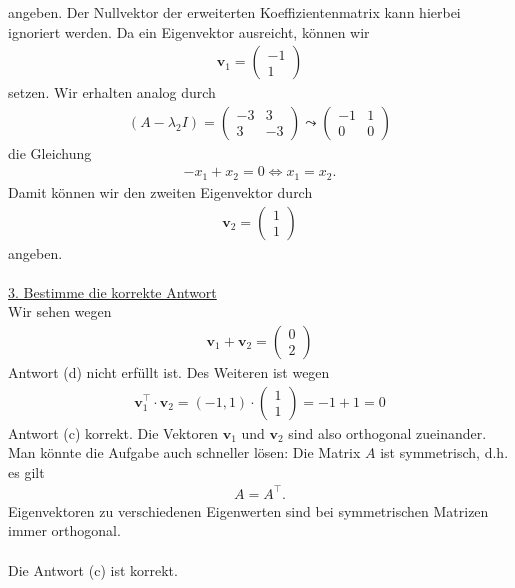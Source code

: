 angeben.
Der Nullvektor der erweiterten Koeffizientenmatrix kann hierbei ignoriert werden.
Da ein Eigenvektor ausreicht, können wir 
\begin{align*}
\textbf{v}_1 = 
\begin{pmatrix}
-1 \\
1
\end{pmatrix}
\end{align*}
setzen.
Wir erhalten analog durch
\begin{align*}
(A - \lambda_2 I) 
= 
\begin{pmatrix}
-3 & 3 \\
3 & -3
\end{pmatrix}
\leadsto
\begin{pmatrix}
-1 & 1 \\
0 & 0
\end{pmatrix}
\end{align*}
die Gleichung
\begin{align*}
-x_1 + x_2 = 0
\Leftrightarrow
x_1 = x_2.
\end{align*}
Damit können wir den zweiten Eigenvektor durch
\begin{align*}
\textbf{v}_2 = 
\begin{pmatrix}
1 \\
1
\end{pmatrix}
\end{align*}
angeben.\\
\\
\underline{3. Bestimme die korrekte Antwort}\\
Wir sehen wegen
\begin{align*}
\textbf{v}_1 + \textbf{v}_2
=
\begin{pmatrix}
0 \\
2
\end{pmatrix}
\end{align*}
Antwort (d) nicht erfüllt ist.
Des Weiteren ist wegen
\begin{align*}
\textbf{v}_1^\top \cdot \textbf{v}_2
=
( -1 , 1) \cdot 
\begin{pmatrix}
1\\
1
\end{pmatrix}
=
-1 + 1 = 0
\end{align*}
Antwort (c) korrekt.
Die Vektoren $\textbf{v}_1$ und $\textbf{v}_2$ sind also orthogonal zueinander.\\
Man könnte die Aufgabe auch schneller lösen: 
Die Matrix $A$ ist symmetrisch, d.h. es gilt
\begin{align*}
A = A^\top.
\end{align*}
Eigenvektoren zu verschiedenen Eigenwerten sind bei symmetrischen Matrizen immer orthogonal.\\
\\
Die Antwort (c) ist korrekt.

